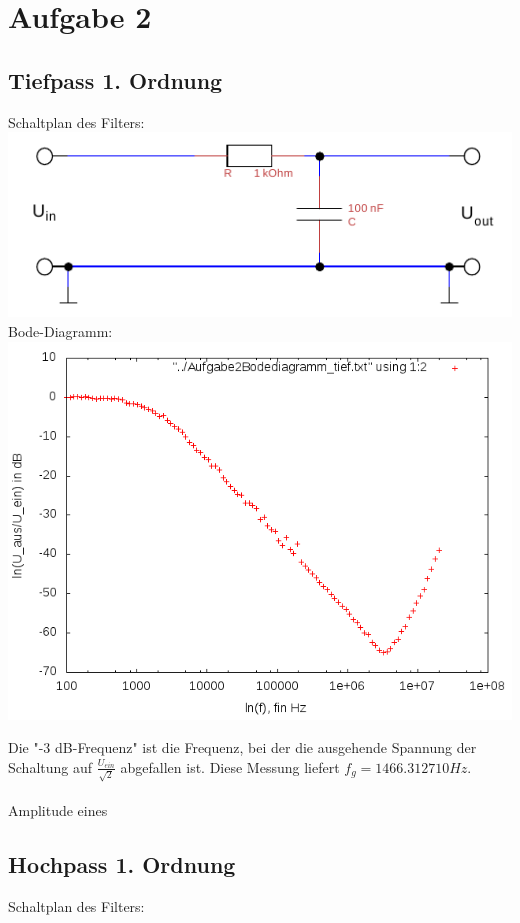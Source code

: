 \documentclass{article}
\begin{document}
\section{Aufgabe 2}
\subsection{Tiefpass 1. Ordnung}
Schaltplan des Filters: \\
\includegraphics[width=\textwidth]{../daten/Messdaten/plots/schalt_tief}
Bode-Diagramm:\\
\includegraphics[width=\textwidth]{../daten/Messdaten/plots/Aufgabe2Bodediagramm_tief_gain}

Die "-3 dB-Frequenz" ist die Frequenz, bei der die ausgehende Spannung der Schaltung auf $\frac{U_{ein}}{\sqrt{2}}$ abgefallen ist. Diese Messung liefert $f_g = 1466.312710 Hz$.\\ \\
Amplitude eines 

\subsection{Hochpass 1. Ordnung}
Schaltplan des Filters:\\
\end{document}
